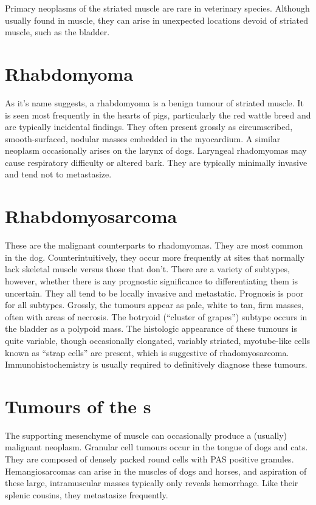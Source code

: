 \documentclass[openany]{book}
\begin{document}
Primary neoplasms of the striated muscle are rare in veterinary species.
Although usually found in muscle, they can arise in unexpected locations
devoid of striated muscle, such as the bladder.

\section{Rhabdomyoma}\label{rhabdomyoma}

As it's name suggests, a rhabdomyoma is a benign tumour of striated
muscle. It is seen most frequently in the hearts of pigs, particularly
the red wattle breed and are typically incidental findings. They often
present grossly as circumscribed, smooth-surfaced, nodular masses
embedded in the myocardium. A similar neoplasm occasionally arises on
the larynx of dogs. Laryngeal rhadomyomas may cause respiratory
difficulty or altered bark. They are typically minimally invasive and
tend not to metastasize.

\section{Rhabdomyosarcoma}\label{rhabdomyosarcoma}

These are the malignant counterparts to rhadomyomas. They are most
common in the dog. Counterintuitively, they occur more frequently at
sites that normally lack skeletal muscle versus those that don't. There
are a variety of subtypes, however, whether there is any prognostic
significance to differentiating them is uncertain. They all tend to be
locally invasive and metastatic. Prognosis is poor for all subtypes.
Grossly, the tumours appear as pale, white to tan, firm masses, often
with areas of necrosis. The botryoid (``cluster of grapes'') subtype
occurs in the bladder as a polypoid mass. The histologic appearance of
these tumours is quite variable, though occasionally elongated, variably
striated, myotube-like cells known as ``strap cells'' are present, which
is suggestive of rhadomyosarcoma. Immunohistochemistry is usually
required to definitively diagnose these tumours.

\section{Tumours of the s}\label{tumours-of-the-s}

The supporting mesenchyme of muscle can occasionally produce a (usually)
malignant neoplasm. Granular cell tumours occur in the tongue of dogs
and cats. They are composed of densely packed round cells with PAS
positive granules. Hemangiosarcomas can arise in the muscles of dogs and
horses, and aspiration of these large, intramuscular masses typically
only reveals hemorrhage. Like their splenic cousins, they metastasize
frequently.
\end{document}
